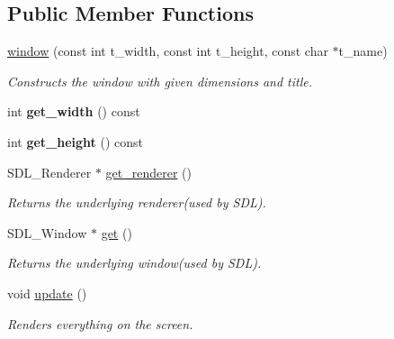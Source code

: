 \subsection*{Public Member Functions}
\begin{DoxyCompactItemize}
\item 
\mbox{\hyperlink{classhw_1_1window_a762764c6be092da20087eeabcd59f6f6}{window}} (const int t\+\_\+width, const int t\+\_\+height, const char $\ast$t\+\_\+name)
\begin{DoxyCompactList}\small\item\em Constructs the window with given dimensions and title. \end{DoxyCompactList}\item 
\mbox{\label{classhw_1_1window_afc619520ac96f4c25af16ba3c55b46e8}} 
int {\bfseries get\+\_\+width} () const
\item 
\mbox{\label{classhw_1_1window_a33ad0df5b3b46f9d579480760c75ebe0}} 
int {\bfseries get\+\_\+height} () const
\item 
\mbox{\label{classhw_1_1window_a5e559ebcf31281c34e5d5c7287b6deca}} 
S\+D\+L\+\_\+\+Renderer $\ast$ \mbox{\hyperlink{classhw_1_1window_a5e559ebcf31281c34e5d5c7287b6deca}{get\+\_\+renderer}} ()
\begin{DoxyCompactList}\small\item\em Returns the underlying renderer(used by S\+D\+L). \end{DoxyCompactList}\item 
\mbox{\label{classhw_1_1window_acb5ff0ac3e5b8bbef83b966729e849ae}} 
S\+D\+L\+\_\+\+Window $\ast$ \mbox{\hyperlink{classhw_1_1window_acb5ff0ac3e5b8bbef83b966729e849ae}{get}} ()
\begin{DoxyCompactList}\small\item\em Returns the underlying window(used by S\+D\+L). \end{DoxyCompactList}\item 
\mbox{\label{classhw_1_1window_a997bc40019b3f1c9a5c6474b71674afa}} 
void \mbox{\hyperlink{classhw_1_1window_a997bc40019b3f1c9a5c6474b71674afa}{update}} ()
\begin{DoxyCompactList}\small\item\em Renders everything on the screen. \end{DoxyCompactList}\item 

\end{DoxyCompactItemize}
